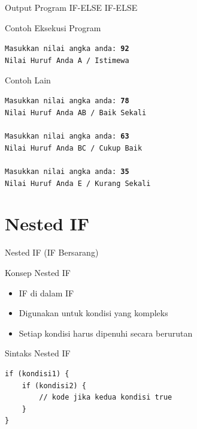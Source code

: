 \documentclass{beamer}
\begin{document}
\begin{frame}{Output Program IF-ELSE IF-ELSE}
\begin{block}{Contoh Eksekusi Program}
\colorbox{gray!20}{
    \parbox{0.9\textwidth}{
        \texttt{Masukkan nilai angka anda: \textbf{92}\\
        Nilai Huruf Anda A / Istimewa}
    }
}
\end{block}

\begin{block}{Contoh Lain}
\colorbox{gray!20}{
    \parbox{0.9\textwidth}{
        \texttt{Masukkan nilai angka anda: \textbf{78}\\
        Nilai Huruf Anda AB / Baik Sekali\\
        \\
        Masukkan nilai angka anda: \textbf{63}\\
        Nilai Huruf Anda BC / Cukup Baik\\
        \\
        Masukkan nilai angka anda: \textbf{35}\\
        Nilai Huruf Anda E / Kurang Sekali}
    }
}
\end{block}
\end{frame}

\section{Nested IF}
\begin{frame}[fragile]{Nested IF (IF Bersarang)}
  \begin{block}{Konsep Nested IF}
    \begin{itemize}
      \item IF di dalam IF
      \item Digunakan untuk kondisi yang kompleks
      \item Setiap kondisi harus dipenuhi secara berurutan
    \end{itemize}
  \end{block}

  \begin{exampleblock}{Sintaks Nested IF}
    \begin{lstlisting}
if (kondisi1) {
    if (kondisi2) {
        // kode jika kedua kondisi true
    }
}
    \end{lstlisting}
  \end{exampleblock}
\end{frame}
\end{document}
